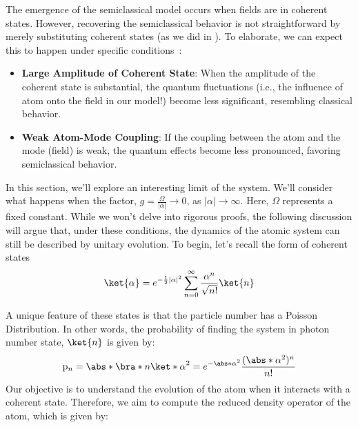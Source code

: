 The emergence of the semiclassical model occurs when fields are in
coherent states. However, recovering the semiclassical behavior is not straightforward by merely substituting coherent states (as we did in ). 
To elaborate, we can expect this to happen under specific conditions~\cite{semiclassical_limit_JC_PRL}:
\begin{itemize}
    \item \textbf{Large Amplitude of Coherent State}: When the amplitude of the coherent state is substantial, 
    the quantum fluctuations (i.e., the influence of atom onto the field in our model!) become less significant, 
    resembling classical behavior.
    \item \textbf{Weak Atom-Mode Coupling}: If the coupling between the atom and the mode (field) is weak, 
    the quantum effects become less pronounced, favoring semiclassical behavior.
\end{itemize}
In this section, we'll explore an interesting limit of the system. We'll consider what happens when the factor, $g = \frac{\Omega}{|\alpha|} \to 0$, as $|\alpha| \rightarrow \infty$. Here, $\Omega$ represents a fixed constant. While we won't delve into rigorous proofs, the following discussion will argue that, under these conditions, the dynamics of the atomic system can still be described by unitary evolution. To begin, let's recall the form of coherent states
\begin{equation}
    \ket{\alpha} = e^{-\frac{1}{2}|\alpha|^2} \sum_{n=0}^{\infty} \frac{\alpha^n}{\sqrt{n!}} \ket{n}
\end{equation}
    
A unique feature of these states is that the particle number has a Poisson Distribution. In other words, the probability of finding the system in photon number state, \(\ket{n}\) is given by:
\begin{equation}
    \mathrm{p}_n = \abs*{\bra*{n}\ket*{\alpha}}^2 
    = e^{-\abs*{\alpha}^2}\frac{(\abs*{\alpha}^2)^n}{n!}
\end{equation}
Our objective is to understand the evolution of the atom when it interacts with a coherent state. 
Therefore, we aim to compute the reduced density operator of the atom, which is given by:

